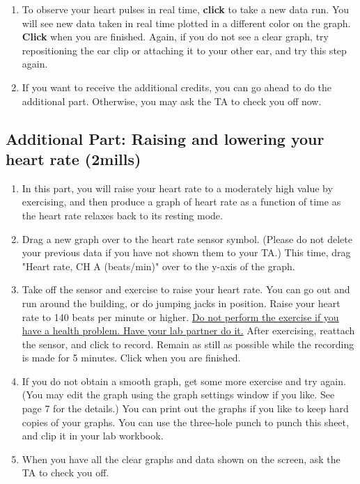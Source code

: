 \documentclass{article}
\begin{document}
\begin{enumerate}
\item To observe your heart pulses in real time, {\bf click}  to take a new data run. You will see new data taken in real time plotted in a different color on the graph. {\bf Click}  when you are finished. Again, if you do not see a clear graph, try repositioning the ear clip or attaching it to your other ear, and try this step again.

\item If you want to receive the additional credits, you can go ahead to do the additional part. Otherwise, you may ask the TA to check you off now. 

\end{enumerate}

\subsection*{Additional Part: Raising and lowering your heart rate (2mills)}

\begin{enumerate}

\item In this part, you will raise your heart rate to a moderately high value by exercising, and then produce a graph of heart rate as a function of time as the heart rate relaxes back to its resting mode. 

\item Drag a new graph over to the heart rate sensor symbol. (Please do not delete your previous data if you have not shown them to your TA.) This time, drag "Heart rate, CH A (beats/min)" over to the y-axis of the graph. 

\item Take off the sensor and exercise to raise your heart rate. You can go out and run around the building, or do jumping jacks in position. Raise your heart rate to 140 beats per minute or higher. \underline{Do not perform the exercise } \underline{if you have a health problem. Have your lab partner do it.}  After exercising, reattach the sensor, and click  to record. Remain as still as possible while the recording is made for 5 minutes. Click  when you are finished.

\item If you do not obtain a smooth graph, get some more exercise and try again. (You may edit the graph using the graph settings window if you like. See page 7 for the details.) You can print out the graphs if you like to keep hard copies of your graphs. You can use the three-hole punch to punch this sheet, and clip it in your lab workbook.

\item When you have all the clear graphs and data shown on the screen, ask the TA to check you off. 

\end{enumerate}
\end{document}
